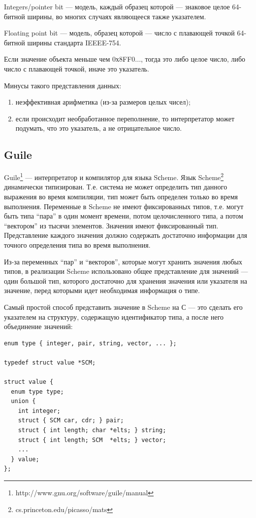 Integers/pointer bit --- модель, каждый образец которой --- знаковое целое 64-битной ширины, 
во многих случаях являющееся также указателем.

Floating point bit --- модель, образец которой --- число с плавающей точкой 64-битной ширины стандарта IEEEE-754.

Если значение объекта меньше чем 0х8FF0..., тогда это либо целое число, либо число с плавающей точкой,
иначе это указатель.

Минусы такого представления данных: 
\begin{enumerate}
\item неэффективная арифметика (из-за размеров целых чисел);
\item если происходит необработанное переполнение, то интерпретатор может 
подумать, что это указатель, а не отрицательное число.
\end{enumerate}

\subsection {Guile}

Guile\footnote{http://www.gnu.org/software/guile/manual} --- интерпретатор и компилятор для языка Sсheme.
Язык Scheme\footnote{cs.princeton.edu/picasso/mats} динамически типизирован.
Т.е. система не может определить тип данного выражения во время компиляции, тип может быть определен только во время выполнения.
Переменные в Scheme не имеют фиксированных типов, т.е. могут быть
типа ``пара'' в один момент времени, потом целочисленного типа, а потом ``вектором'' из тысячи элементов. Значения
имеют фиксированный тип. Представление каждого значения должно содержать достаточно
информации для точного определения типа во время выполнения.

Из-за переменных ``пар'' и ``векторов'', которые могут хранить значения любых типов,
в реализации Scheme использовано общее представление для значений ---
один большой тип, которого достаточно для хранения значения или указателя на значение,
перед которыми идет необходимая информация о типе.

Самый простой способ представить значение в Scheme на С --- это сделать его указателем на структуру, содержащую идентификатор типа, а после него объединение 
 значений:

\begin{lstlisting}
enum type { integer, pair, string, vector, ... };
  
typedef struct value *SCM;
  
struct value {
  enum type type;
  union {
    int integer;
    struct { SCM car, cdr; } pair;
    struct { int length; char *elts; } string;
    struct { int length; SCM  *elts; } vector;
    ...
  } value;
};
\end{lstlisting}

